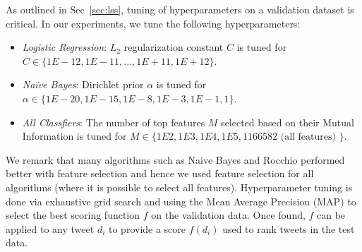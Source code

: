 As outlined in Sec~\ref{sec:lss}, tuning of hyperparameters on a validation
dataset is critical.  In our experiments, we tune the following hyperparameters:
\begin{itemize}
\item \textit{Logistic Regression}: $L_2$ regularization constant $C$ is tuned for $C \in \{1E-12, 1E-11, ..., 1E+11, 1E+12\}$.
\item \textit{Na\"{i}ve Bayes}: Dirichlet prior $\alpha$ is tuned for $\alpha \in \{1E-20, 1E-15, 1E-8, 1E-3, 1E-1, 1\}$.
\item \textit{All Classfiers}: The number of top features $M$ selected based on their Mutual Information is tuned for $M \in \{1E2, 1E3, 1E4, 1E5, 1166582 \textrm{ (all features) } \}$.
\end{itemize}
We remark that many algorithms such as Naive Bayes and Rocchio
performed better with feature selection and hence we used feature
selection for all algorithms (where it is possible to select all
features).  Hyperparameter tuning is done via exhaustive grid search
and using the Mean Average Precision
(MAP) to select the best scoring function $f$ on the validation data.
Once found, $f$ can be applied to any tweet $d_i$ to provide a score $f(d_i)$
used to rank tweets in the test data.
%
%
